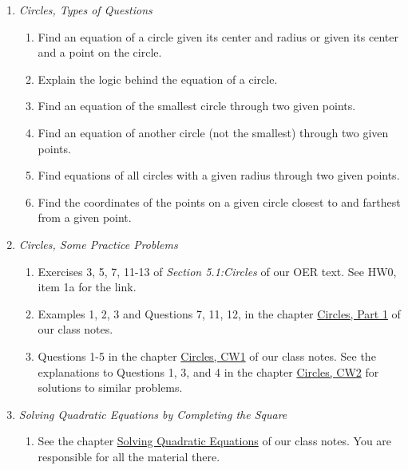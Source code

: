 \documentclass{ximera}
\begin{document}
\begin{enumerate}
\item \emph{Circles, Types of Questions}

\begin{enumerate}
\item Find an equation of a circle given its center and radius or given its center and a point on the circle.

\item Explain the logic behind the equation of a circle.

\item Find an equation of the smallest circle through two given points.

\item Find an equation of another circle (not the smallest) through two given points.

\item Find equations of all circles with a given radius through two given points.

\item Find the coordinates of the points on a given circle closest to and farthest from a given point.
\end{enumerate} 

\item \emph{Circles, Some Practice Problems}

\begin{enumerate}
\item  Exercises 3, 5, 7, 11-13 of \emph{Section 5.1:Circles} of our OER text. See HW0, item 1a for the link.

\item Examples 1, 2, 3 and Questions 7, 11, 12, in the chapter \href{https://ximera.osu.edu/precalc1/PreCalculus1/Circles/Circles}{Circles, Part 1} of our class notes.

\item Questions 1-5 in the chapter \href{https://ximera.osu.edu/precalc1/PreCalculus1/CirclesCW1/CirclesCW1}{Circles, CW1} of our class notes. See the explanations to Questions 1, 3, and 4 in the chapter \href{https://ximera.osu.edu/precalc1/PreCalculus1/CirclesCW2/CirclesCW2}{Circles, CW2} for solutions to similar problems.

\end{enumerate}

\item \emph{Solving Quadratic Equations by Completing the Square}

\begin{enumerate}
\item See the chapter \href{https://ximera.osu.edu/precalc1/PreCalculus1/SolvingQuadraticEqs/SolvingQuadraticEqs}{Solving Quadratic Equations} of our class notes. You are responsible for all the material there.


\end{enumerate}
\end{enumerate}
\end{document}
